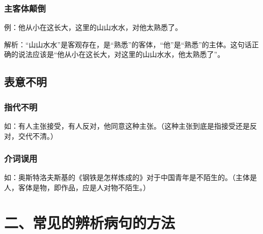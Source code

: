 \subsubsection{主客体颠倒}

例：他从小在这长大，这里的山山水水，对他太熟悉了。

解析：“山山水水”是客观存在，是“熟悉”的客体，“他”是“熟悉”的主体。这句话正确的说法应该是“他从小在这长大，对这里的山山水水，他太熟悉了”。

\subsection{表意不明}

\subsubsection{指代不明}

如：有人主张接受，有人反对，他同意这种主张。（这种主张到底是指接受还是反对，交代不清。）

\subsubsection{介词误用}

如：奥斯特洛夫斯基的《钢铁是怎样炼成的》对于中国青年是不陌生的。（主体是人，客体是物，即作品，应是人对物不陌生。）

\section{二、常见的辨析病句的方法}

